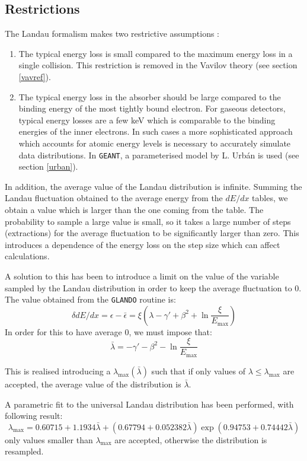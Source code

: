 \documentclass{article}
\newcommand{\Emax}{\ensuremath{E_{\mathrm{max}}}}
\newcommand{\GEANT}{\texttt{GEANT}}
\begin{document}
\subsection{Restrictions}

The Landau formalism makes two restrictive assumptions :
\begin{enumerate}
\item The typical energy loss is small compared to the maximum energy
  loss in a single collision.  This restriction is removed in the
  Vavilov theory (see section \ref{vavref}).
\item The typical energy loss in the absorber should be large compared
  to the binding energy of the most tightly bound electron.  For
  gaseous detectors, typical energy losses are a few keV which is
  comparable to the binding energies of the inner electrons.  In such
  cases a more sophisticated approach which accounts for atomic energy
  levels\cite{bib-TALM} is necessary to accurately simulate data
  distributions. In \GEANT, a parameterised model by L.  Urb\'{a}n is
  used (see section \ref{urban}).
\end{enumerate}

In addition, the average value of the Landau distribution is infinite.
Summing the Landau fluctuation obtained to the average energy from the
$dE/dx$ tables, we obtain a value which is larger than the one coming
from the table.  The probability to sample a large value is small, so
it takes a large number of steps (extractions) for the average
fluctuation to be significantly larger than zero. This introduces a
dependence of the energy loss on the step size which can affect
calculations.

A solution to this has been to introduce a limit on the value of the
variable sampled by the Landau distribution in order to keep the
average fluctuation to 0. The value obtained from the \texttt{GLANDO}
routine is:
\[
\delta dE/dx = \epsilon - \bar{\epsilon} = \xi ( \lambda - \gamma'
+\beta^2 +\ln \frac{\xi}{\Emax})
\]
In order for this to have average 0, we must impose that:
\[
\bar{\lambda} = -\gamma' - \beta^2 -\ln \frac{\xi}{\Emax}
\]

This is realised introducing a $\lambda_{\mathrm{max}}(\bar{\lambda})$
such that if only values of $\lambda \leq \lambda_{\mathrm{max}}$ are
accepted, the average value of the distribution is $\bar{\lambda}$.

A parametric fit to the universal Landau distribution has been
performed, with following result:
\[
\lambda_{\mathrm{max}} = 0.60715 +
     1.1934\bar{\lambda}+(0.67794+0.052382\bar{\lambda})
     \exp(0.94753+0.74442\bar{\lambda})
\]
only values smaller than $\lambda_{\mathrm{max}}$ are accepted, otherwise the
distribution is resampled.
\end{document}
